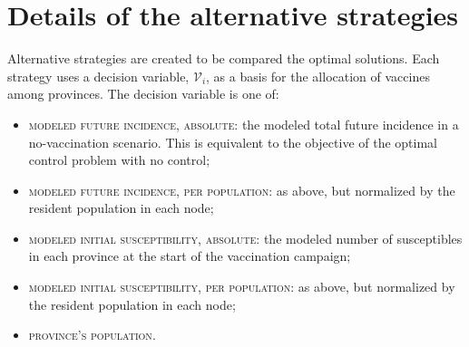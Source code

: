 \section{Details of the alternative strategies}
Alternative strategies are created to be compared the optimal solutions. Each strategy uses a decision variable, $\mathcal{V}_i$, as a basis for the allocation of vaccines among provinces. The decision variable is one of:
\begin{itemize}
    \item \textsc{modeled future incidence, absolute}: the modeled total future incidence in a no-vaccination scenario. This is equivalent to the objective of the optimal control problem with no control;
    \item \textsc{modeled future incidence, per population}: as above, but normalized by the resident population in each node;
    \item \textsc{modeled initial susceptibility, absolute}: the modeled number of susceptibles in each province at the start of the vaccination campaign;
    \item \textsc{modeled initial susceptibility, per population}: as above, but normalized by the resident population in each node;
    \item \textsc{province's population}.
\end{itemize}

